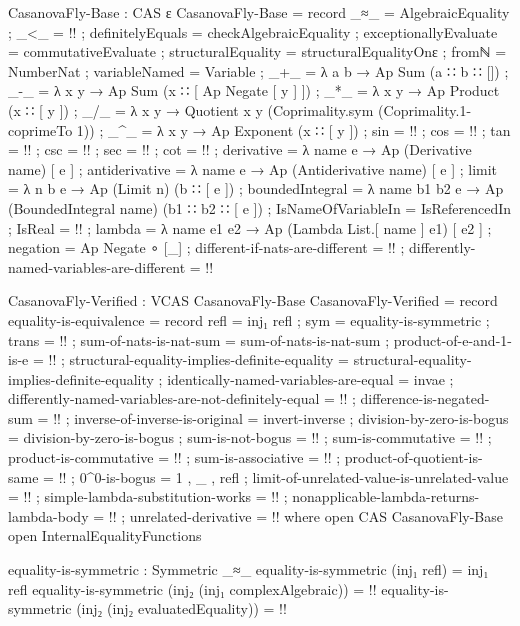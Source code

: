 \documentclass{report}
\begin{document}
\begin{code}
CasanovaFly-Base : CAS ε
CasanovaFly-Base = record
  { _≈_ = AlgebraicEquality
  ; _<_ = {!!}
  ; definitelyEquals = checkAlgebraicEquality
  ; exceptionallyEvaluate = commutativeEvaluate
  ; structuralEquality = structuralEqualityOnε
  ; fromℕ = NumberNat
  ; variableNamed = Variable
  ; _+_ = λ a b → Ap Sum (a ∷ b ∷ [])
  ; _-_ = λ x y → Ap Sum (x ∷ [ Ap Negate [ y ] ])
  ; _*_ = λ x y → Ap Product (x ∷ [ y ])
  ; _/_ = λ x y → Quotient x y (Coprimality.sym (Coprimality.1-coprimeTo 1))
  ; _^_ = λ x y → Ap Exponent (x ∷ [ y ])
  ; sin = {!!}
  ; cos = {!!}
  ; tan = {!!}
  ; csc = {!!}
  ; sec = {!!}
  ; cot = {!!}
  ; derivative = λ name e → Ap (Derivative name) [ e ]
  ; antiderivative = λ name e → Ap (Antiderivative name) [ e ]
  ; limit = λ n b e → Ap (Limit n) (b ∷ [ e ])
  ; boundedIntegral = λ name b1 b2 e → Ap (BoundedIntegral name) (b1 ∷ b2 ∷ [ e ])
  ; IsNameOfVariableIn = IsReferencedIn
  ; IsReal = {!!}
  ; lambda = λ name e1 e2 → Ap (Lambda List.[ name ] e1) [ e2 ]
  ; negation = Ap Negate ∘ [_]
  ; different-if-nats-are-different = {!!}
  ; differently-named-variables-are-different = {!!}
  }

CasanovaFly-Verified : VCAS CasanovaFly-Base
CasanovaFly-Verified = record
  { equality-is-equivalence = record
    { refl = inj₁ refl
    ; sym = equality-is-symmetric
    ; trans = {!!}
    }
  ; sum-of-nats-is-nat-sum = sum-of-nats-is-nat-sum
  ; product-of-e-and-1-is-e = {!!}
  ; structural-equality-implies-definite-equality =
    structural-equality-implies-definite-equality
  ; identically-named-variables-are-equal = invae
  ; differently-named-variables-are-not-definitely-equal = {!!}
  ; difference-is-negated-sum = {!!}
  ; inverse-of-inverse-is-original = invert-inverse
  ; division-by-zero-is-bogus = division-by-zero-is-bogus
  ; sum-is-not-bogus = {!!}
  ; sum-is-commutative = {!!}
  ; product-is-commutative = {!!}
  ; sum-is-associative = {!!}
  ; product-of-quotient-is-same = {!!}
  ; 0^0-is-bogus = 1 , _ , refl
  ; limit-of-unrelated-value-is-unrelated-value = {!!}
  ; simple-lambda-substitution-works = {!!}
  ; nonapplicable-lambda-returns-lambda-body = {!!}
  ; unrelated-derivative = {!!}
  }
  where
  open CAS CasanovaFly-Base
  open InternalEqualityFunctions

  equality-is-symmetric : Symmetric _≈_
  equality-is-symmetric (inj₁ refl) = inj₁ refl
  equality-is-symmetric (inj₂ (inj₁ complexAlgebraic)) = {!!}
  equality-is-symmetric (inj₂ (inj₂ evaluatedEquality)) = {!!}


\end{code}
\end{document}
